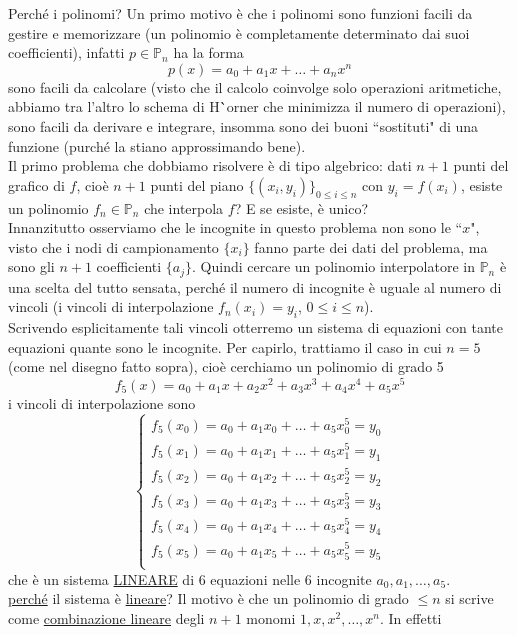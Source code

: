 Perché i polinomi? Un primo motivo è che i polinomi sono funzioni facili da gestire e memorizzare (un polinomio è completamente determinato dai suoi coefficienti), infatti $p \in \mathbb{P}_n$ ha la forma 
\[ p(x) = a_0 + a_1x + \dotso + a_n x^n \]
sono facili da calcolare (visto che il calcolo coinvolge solo operazioni aritmetiche, abbiamo tra l'altro lo schema di H{\``o}rner che minimizza il numero di operazioni), sono facili da derivare e integrare, insomma sono dei buoni ``sostituti" di una funzione (purché la stiano approssimando bene). \\
Il primo problema che dobbiamo risolvere è di tipo algebrico: dati $n+1$ punti del grafico di $f$, cioè $n+1$ punti del piano $\{(x_i,y_i)\}_{0\leq i\leq n}$ con $y_i=f(x_i)$, esiste un polinomio $f_n\in\mathbb{P}_n$ che interpola $f$? E se esiste, è unico?\\ Innanzitutto osserviamo che le incognite in questo problema non sono le ``$x$", visto che i nodi di campionamento $\{x_i\}$ fanno parte dei dati del problema, ma sono gli $n+1$ coefficienti $\{a_j\}$. Quindi cercare un polinomio interpolatore in $\mathbb{P}_n$ è una scelta del tutto sensata, perché il numero di incognite è uguale al numero di vincoli (i vincoli di interpolazione $f_n(x_i)=y_i$, $0\leq i\leq n$).\\Scrivendo esplicitamente tali vincoli otterremo un sistema di equazioni con tante equazioni quante sono le incognite. Per capirlo, trattiamo il caso in cui $n=5$ (come nel disegno fatto sopra), cioè cerchiamo un polinomio di grado 5
\[ f_5(x)=a_0+a_1x+a_2x^2+a_3x^3+a_4x^4+a_5x^5 \]
i vincoli di interpolazione sono 
\[ \begin{cases}
    f_5(x_0)=a_0+a_1x_0+\dotso+a_5x_0^5=y_0\\
    f_5(x_1)=a_0+a_1x_1+\dotso+a_5x_1^5=y_1\\
    f_5(x_2)=a_0+a_1x_2+\dotso+a_5x_2^5=y_2\\
    f_5(x_3)=a_0+a_1x_3+\dotso+a_5x_3^5=y_3\\
    f_5(x_4)=a_0+a_1x_4+\dotso+a_5x_4^5=y_4\\
    f_5(x_5)=a_0+a_1x_5+\dotso+a_5x_5^5=y_5\\
\end{cases} \]
che è un sistema \uline{LINEARE} di 6 equazioni nelle 6 incognite $a_0,a_1,\dotso,a_5$.\\ 
\uline{perché} il sistema è \uline{lineare}? Il motivo è che un polinomio di grado $\leq n$ si scrive come \uline{combinazione lineare} degli $n+1$ monomi $1, x, x^2, \dotso, x^n$. In effetti
